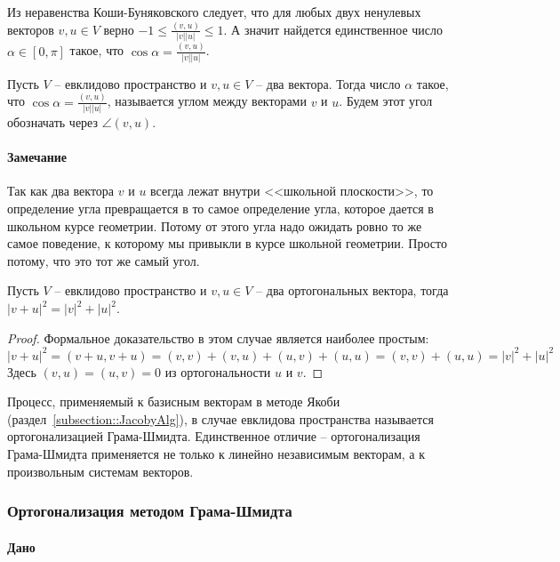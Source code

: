 Из неравенства Коши-Буняковского следует, что для любых двух ненулевых векторов $v,u\in V$ верно $-1\leqslant \frac{(v,u)}{|v| |u|}\leqslant 1$.
А значит найдется единственное число $\alpha\in [0,\pi]$ такое, что $\cos \alpha = \frac{(v,u)}{|v| |u|}$.

\begin{definition}
Пусть $V$ -- евклидово пространство и $v,u\in V$ -- два вектора.
Тогда число $\alpha$ такое, что $\cos \alpha = \frac{(v,u)}{|v| |u|}$, называется углом между векторами $v$ и $u$.
Будем этот угол обозначать через $\angle(v, u)$.
\end{definition}

\paragraph{Замечание}

Так как два вектора $v$ и $u$ всегда лежат внутри <<школьной плоскости>>, то определение угла превращается в то самое определение угла, которое дается в школьном курсе геометрии.
Потому от этого угла надо ожидать ровно то же самое поведение, к которому мы привыкли в курсе школьной геометрии.
Просто потому, что это тот же самый угол.


\begin{claim}
\label{claim::Pythagoras}
Пусть $V$ -- евклидово пространство и $v,u\in V$ -- два ортогональных вектора, тогда $|v + u|^2 = |v|^2 + |u|^2$.
\end{claim}
\begin{proof}
Формальное доказательство в этом случае является наиболее простым:
\[
|v+u|^2 = (v+u, v+u) = (v,v) + (v,u)+(u,v) +(u,u) = (v,v) + (u,u) = |v|^2 + |u|^2
\]
Здесь $(v,u)=(u,v) = 0$ из ортогональности $u$ и $v$.
\end{proof}

Процесс, применяемый к базисным векторам в методе Якоби (раздел~\ref{subsection::JacobyAlg}), в случае евклидова пространства называется ортогонализацией Грама-Шмидта.
Единственное отличие -- ортогонализация Грама-Шмидта применяется не только к линейно независимым векторам, а к произвольным системам векторов.

\subsubsection*{Ортогонализация методом Грама-Шмидта}

\paragraph{Дано}


